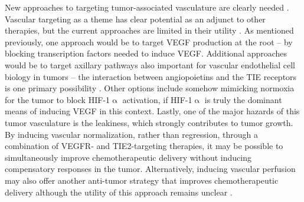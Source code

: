 New approaches to targeting tumor\hyp{}associated vasculature are clearly needed \citep{Cesca2013, Hara2016}. Vascular targeting as a theme has clear potential as an adjunct to other therapies, but the current approaches are limited in their utility \citep{Neri2005}. As mentioned previously, one approach would be to target VEGF production at the root -- by blocking transcription factors needed to induce VEGF. Additional approaches would be to target axillary pathways also important for vascular endothelial cell biology in tumors -- the interaction between angiopoietins and the TIE receptors is one primary possibility \citep{Hato2008, Fujita2017}. Other options include somehow mimicking normoxia for the tumor to block HIF\hyp{}1$\upalpha$ activation, if HIF\hyp{}1$\upalpha$ is truly the dominant means of inducing VEGF in this context. Lastly, one of the major hazards of this tumor vasculature is the leakiness, which strongly contributes to tumor growth. By inducing vascular normalization, rather than regression, through a combination of VEGFR\hyp{} and TIE2\hyp{}targeting therapies, it may be possible to simultaneously improve chemotherapeutic delivery without inducing compensatory responses in the tumor. Alternatively, inducing vascular perfusion may also offer another anti\hyp{}tumor strategy that improves chemotherapeutic delivery although the utility of this approach remains unclear \citep{Rivera2015}.

